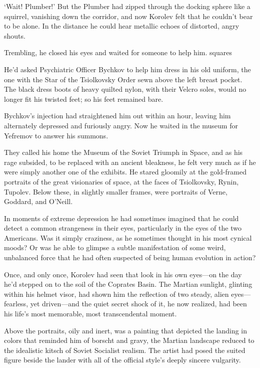 `Wait! Plumber!' But the Plumber had zipped through the docking sphere like a squirrel, vanishing down the corridor, and now Korolev felt that he couldn't bear to be alone. In the distance he could hear metallic echoes of distorted, angry shouts.

Trembling, he closed his eyes and waited for someone to help him.
squares

He'd asked Psychiatric Officer Bychkov to help him dress in his old uniform, the one with the Star of the Tsiolkovsky Order sewn above the left breast pocket. The black dress boots of heavy quilted nylon, with their Velcro soles, would no longer fit his twisted feet; so his feet remained bare.

Bychkov's injection had straightened him out within an hour, leaving him alternately depressed and furiously angry. Now he waited in the museum for Yefremov to answer his summons.

They called his home the Museum of the Soviet Triumph in Space, and as his rage subsided, to be replaced with an ancient bleakness, he felt very much as if he were simply another one of the exhibits. He stared gloomily at the gold-framed portraits of the great visionaries of space, at the faces of Tsiolkovsky, Rynin, Tupolev. Below these, in slightly smaller frames, were portraits of Verne, Goddard, and O'Neill.

In moments of extreme depression he had sometimes imagined that he could detect a common strangeness in their eyes, particularly in the eyes of the two Americans. Was it simply craziness, as he sometimes thought in his most cynical moods? Or was he able to glimpse a subtle manifestation of some weird, unbalanced force that he had often suspected of being human evolution in action?

Once, and only once, Korolev had seen that look in his own eyes---on the day he'd stepped on to the soil of the Coprates Basin. The Martian sunlight, glinting within his helmet visor, had shown him the reflection of two steady, alien eyes---fearless, yet driven---and the quiet secret shock of it, he now realized, had been his life's most memorable, most transcendental moment.

Above the portraits, oily and inert, was a painting that depicted the landing in colors that reminded him of borscht and gravy, the Martian landscape reduced to the idealistic kitsch of Soviet Socialist realism. The artist had posed the suited figure beside the lander with all of the official style's deeply sincere vulgarity.

